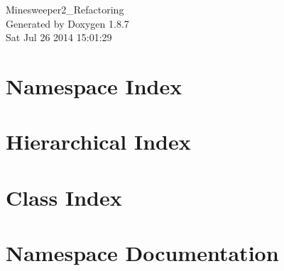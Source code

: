 \documentclass[twoside]{book}
\newcommand{\+}{\discretionary{\mbox{\scriptsize$\hookleftarrow$}}{}{}}
\newcommand{\clearemptydoublepage}{%
  \newpage{\pagestyle{empty}\cleardoublepage}%
}
\begin{document}
\hypersetup{pageanchor=false,
             bookmarks=true,
             bookmarksnumbered=true,
             pdfencoding=unicode
            }
\begin{titlepage}
\vspace*{7cm}
\begin{center}%
{\Large Minesweeper2\+\_\+\+Refactoring }\\
\vspace*{1cm}
{\large Generated by Doxygen 1.8.7}\\
\vspace*{0.5cm}
{\small Sat Jul 26 2014 15:01:29}\\
\end{center}
\end{titlepage}
\clearemptydoublepage
\tableofcontents
\clearemptydoublepage
{}
\hypersetup{pageanchor=true}

\chapter{Namespace Index}

\chapter{Hierarchical Index}

\chapter{Class Index}

\chapter{Namespace Documentation}







\end{document}
